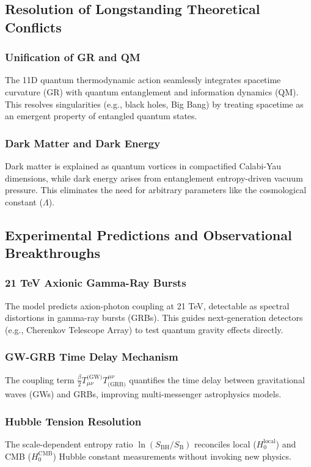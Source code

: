 \documentclass[12pt, a4paper]{article}
\begin{document}
\subsection{Resolution of Longstanding Theoretical Conflicts}
\subsubsection{Unification of GR and QM}
The 11D quantum thermodynamic action seamlessly integrates spacetime curvature (GR) with quantum entanglement and information dynamics (QM). This resolves singularities (e.g., black holes, Big Bang) by treating spacetime as an emergent property of entangled quantum states.

\subsubsection{Dark Matter and Dark Energy}
Dark matter is explained as quantum vortices in compactified Calabi-Yau dimensions, while dark energy arises from entanglement entropy-driven vacuum pressure. This eliminates the need for arbitrary parameters like the cosmological constant ($\Lambda$).

\subsection{Experimental Predictions and Observational Breakthroughs}
\subsubsection{21 TeV Axionic Gamma-Ray Bursts}
The model predicts axion-photon coupling at 21 TeV, detectable as spectral distortions in gamma-ray bursts (GRBs). This guides next-generation detectors (e.g., Cherenkov Telescope Array) to test quantum gravity effects directly.

\subsubsection{GW-GRB Time Delay Mechanism}
The coupling term \( \frac{\beta}{2} T_{\mu\nu}^{\text{(GW)}} T^{\mu\nu}_{\text{(GRB)}} \) quantifies the time delay between gravitational waves (GWs) and GRBs, improving multi-messenger astrophysics models.

\subsubsection{Hubble Tension Resolution}
The scale-dependent entropy ratio \( \ln(S_{\text{BH}}/S_{\text{B}}) \) reconciles local (\( H_0^{\text{local}} \)) and CMB (\( H_0^{\text{CMB}} \)) Hubble constant measurements without invoking new physics.
\end{document}

